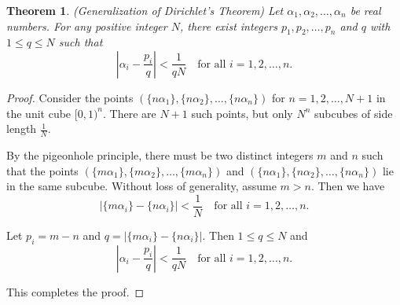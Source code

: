 \documentclass{article}
\newtheorem{theorem}{Theorem}
\begin{document}
\begin{theoremframe}
\begin{theorem}
  (Generalization of Dirichlet's Theorem) Let \(\alpha_1, \alpha_2, \ldots, \alpha_n\) be real numbers. For any positive integer \(N\), there exist integers \(p_1, p_2, \ldots, p_n\) and \(q\) with \(1 \leq q \leq N\) such that
  \[
  \left| \alpha_i - \frac{p_i}{q} \right| < \frac{1}{qN} \quad \text{for all } i = 1, 2, \ldots, n.
  \]
\end{theorem}
\end{theoremframe}


\begin{proofframe}
\begin{proof}
  Consider the points \((\{n\alpha_1\}, \{n\alpha_2\}, \ldots, \{n\alpha_n\})\) for \(n = 1, 2, \ldots, N+1\) in the unit cube \([0, 1)^n\). There are \(N+1\) such points, but only \(N^n\) subcubes of side length \(\frac{1}{N}\).

  By the pigeonhole principle, there must be two distinct integers \(m\) and \(n\) such that the points \((\{m\alpha_1\}, \{m\alpha_2\}, \ldots, \{m\alpha_n\})\) and \((\{n\alpha_1\}, \{n\alpha_2\}, \ldots, \{n\alpha_n\})\) lie in the same subcube. Without loss of generality, assume \(m > n\). Then we have
  \[
  \left| \{m\alpha_i\} - \{n\alpha_i\} \right| < \frac{1}{N} \quad \text{for all } i = 1, 2, \ldots, n.
  \]

  Let \(p_i = m - n\) and \(q = \left| \{m\alpha_i\} - \{n\alpha_i\} \right|\). Then \(1 \leq q \leq N\) and
  \[
  \left| \alpha_i - \frac{p_i}{q} \right| < \frac{1}{qN} \quad \text{for all } i = 1, 2, \ldots, n.
  \]

  This completes the proof.
\end{proof}
\end{proofframe}
\end{document}

